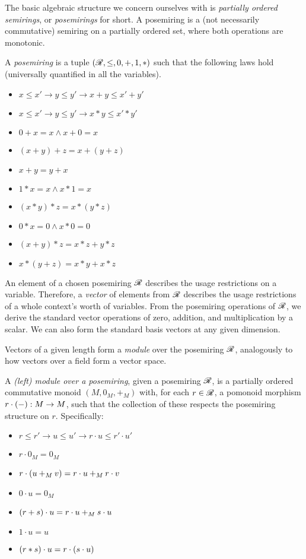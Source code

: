 The basic algebraic structure we concern ourselves with is \emph{partially
ordered semirings}, or \emph{posemirings} for short.
A posemiring is a (not necessarily commutative) semiring on a partially ordered
set, where both operations are monotonic.

\begin{definition}
  A \emph{posemiring} is a tuple $(\mathscr R, \leq, 0, +, 1, *)$ such that the
  following laws hold (universally quantified in all the variables).
  \begin{itemize}
    \item $x \leq x' \to y \leq y' \to x + y \leq x' + y'$
    \item $x \leq x' \to y \leq y' \to x * y \leq x' * y'$
    \item $0 + x = x \land x + 0 = x$
    \item $(x + y) + z = x + (y + z)$
    \item $x + y = y + x$
    \item $1 * x = x \land x * 1 = x$
    \item $(x * y) * z = x * (y * z)$
    \item $0 * x = 0 \land x * 0 = 0$
    \item $(x + y) * z = x * z + y * z$
    \item $x * (y + z) = x * y + x * z$
  \end{itemize}
\end{definition}

An element of a chosen posemiring $\mathscr R$ describes the usage restrictions on
a variable.
Therefore, a \emph{vector} of elements from $\mathscr R$ describes the usage
restrictions of a whole context's worth of variables.
From the posemiring operations of $\mathscr R$, we derive the standard vector
operations of zero, addition, and multiplication by a scalar.
We can also form the standard basis vectors at any given dimension.

Vectors of a given length form a \emph{module} over the posemiring $\mathscr R$,
analogously to how vectors over a field form a vector space.

\begin{definition}
  A \emph{(left) module over a posemiring}, given a posemiring $\mathscr R$, is a
  partially ordered commutative monoid $(M, 0_M, +_M)$ with, for each
  $r \in \mathscr R$, a pomonoid morphism $r \cdot \plr{-} : M \to M$, such that the
  collection of these respects the posemiring structure on $r$.
  Specifically:
  \begin{itemize}
    \item $r \leq r' \to u \leq u' \to r \cdot u \leq r' \cdot u'$
    \item $r \cdot 0_M = 0_M$
    \item $r \cdot \plr{u +_M v} = r \cdot u +_M r \cdot v$
    \item $0 \cdot u = 0_M$
    \item $\plr{r + s} \cdot u = r \cdot u +_M s \cdot u$
    \item $1 \cdot u = u$
    \item $\plr{r * s} \cdot u = r \cdot \plr{s \cdot u}$
  \end{itemize}
\end{definition}

